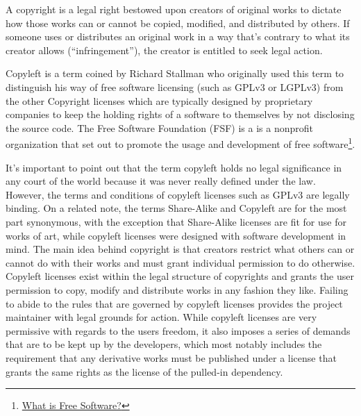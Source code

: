 \begin{flushleft}
	A copyright is a legal right bestowed upon creators of original works to dictate
	how those works can or cannot be copied, modified, and distributed by others. If
	someone uses or distributes an original work in a way that's contrary to what its
	creator allows (``infringement''), the creator is entitled to seek legal action.
\end{flushleft}

\begin{flushleft}
	Copyleft is a term coined by Richard Stallman who originally used this term to
	distinguish his way of free software licensing (such as GPLv3 or LGPLv3) from
	the other Copyright licenses which are typically designed by proprietary companies
	to keep the holding rights of a software to themselves by not disclosing the source
	code. The Free Software Foundation (FSF) is a  is a nonprofit organization that set
	out to promote the usage and development of free software\footnote{\href{https://www.gnu.org/philosophy/free-sw.html.en}{What is Free Software?}}.
\end{flushleft}

\begin{flushleft}
	It's important to point out that the term copyleft holds no legal significance
	in any court of the world because it was never really defined under the law.
	However, the terms and conditions of copyleft licenses such as GPLv3 are legally
	binding. On a related note, the terms Share-Alike and Copyleft are for the most
	part synonymous, with the exception that Share-Alike licenses are fit for use for
	works of art, while copyleft licenses were designed with software development in
	mind. The main idea behind copyright is that creators restrict what others can or
	cannot do with their works and must grant individual permission to do otherwise.
	Copyleft licenses exist within the legal structure of copyrights and grants the
	user permission to copy, modify and distribute works in any fashion they like.
	Failing to abide to the rules that are governed by copyleft licenses provides
	the project maintainer with legal grounds for action. While copyleft licenses are
	very permissive with regards to the users freedom, it also imposes a series of
	demands that are to be kept up by the developers, which most notably includes
	the requirement that any derivative works must be published under a license that
	grants the same rights as the license of the pulled-in dependency.
\end{flushleft}


